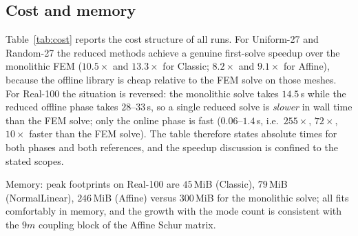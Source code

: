 \documentclass[11pt,a4paper]{article}
\begin{document}
\subsection{Cost and memory}
\label{sec:realcost}

Table~\ref{tab:cost} reports the cost structure of all runs.  For
Uniform-27 and Random-27 the reduced methods achieve a genuine
first-solve speedup over the monolithic FEM ($10.5\times$ and $13.3\times$
for Classic; $8.2\times$ and $9.1\times$ for Affine), because the
offline library is cheap relative to the FEM solve on those meshes.
For Real-100 the situation is reversed: the monolithic solve takes
$14.5\,$s while the reduced offline phase takes $28$--$33\,$s, so a
single reduced solve is \emph{slower} in wall time than the FEM solve;
only the online phase is fast ($0.06$--$1.4\,$s, i.e.\ $255\times$,
$72\times$, $10\times$ faster than the FEM solve).  The table therefore
states absolute times for both phases and both references, and the
speedup discussion is confined to the stated scopes.

Memory: peak footprints on Real-100 are $45$\,MiB (Classic),
$79$\,MiB (NormalLinear), $246$\,MiB (Affine) versus $300$\,MiB for the
monolithic solve; all fits comfortably in memory, and the growth with
the mode count is consistent with the $9m$ coupling block of the
Affine Schur matrix.
\end{document}

